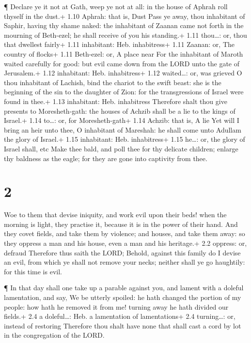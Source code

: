  ¶ Declare ye it not at Gath, weep ye not at all: in the
house of Aphrah roll thyself in the dust.+ 1.10 Aphrah: that is, Dust
 Pass ye away, thou inhabitant of Saphir, having thy shame
naked: the inhabitant of Zaanan came not forth in the mourning of
Beth-ezel; he shall receive of you his standing.+ 1.11 thou\ldots: or,
thou that dwellest fairly+ 1.11 inhabitant: Heb. inhabitress+ 1.11
Zaanan: or, The country of flocks+ 1.11 Beth-ezel: or, A place near
 For the inhabitant of Maroth waited carefully for good:
but evil came down from the LORD unto the gate of Jerusalem.+ 1.12
inhabitant: Heb. inhabitress+ 1.12 waited\ldots: or, was grieved
 O thou inhabitant of Lachish, bind the chariot to the
swift beast: she is the beginning of the sin to the daughter of Zion:
for the transgressions of Israel were found in thee.+ 1.13 inhabitant:
Heb. inhabitress  Therefore shalt thou give presents to
Moresheth-gath: the houses of Achzib shall be a lie to the kings of
Israel.+ 1.14 to\ldots: or, for Moresheth-gath+ 1.14 Achzib: that is, A
lie  Yet will I bring an heir unto thee, O inhabitant of
Mareshah: he shall come unto Adullam the glory of Israel.+ 1.15
inhabitant: Heb. inhabitress+ 1.15 he\ldots: or, the glory of Israel
shall, etc  Make thee bald, and poll thee for thy delicate
children; enlarge thy baldness as the eagle; for they are gone into
captivity from thee.

\hypertarget{section-1}{%
\section{2}\label{section-1}}

 Woe to them that devise iniquity, and work evil upon their
beds! when the morning is light, they practise it, because it is in the
power of their hand.  And they covet fields, and take them
by violence; and houses, and take them away: so they oppress a man and
his house, even a man and his heritage.+ 2.2 oppress: or, defraud
 Therefore thus saith the LORD; Behold, against this family
do I devise an evil, from which ye shall not remove your necks; neither
shall ye go haughtily: for this time is evil.

 ¶ In that day shall one take up a parable against you, and
lament with a doleful lamentation, and say, We be utterly spoiled: he
hath changed the portion of my people: how hath he removed it from me!
turning away he hath divided our fields.+ 2.4 a doleful\ldots: Heb. a
lamentation of lamentations+ 2.4 turning\ldots: or, instead of restoring
 Therefore thou shalt have none that shall cast a cord by
lot in the congregation of the LORD.

